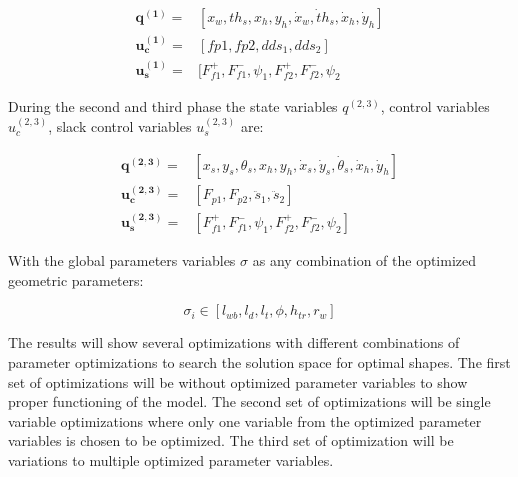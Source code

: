 \documentclass[default,iicol]{sn-jnl}
\begin{document}
{\begin{equation}
\begin{array}{rl}
   \mathbf{q^{(1)}} =& [x_w , th_s, x_h, y_h, \dot x_w, \dot th_s,\dot x_h, \dot y_h]    \\
   \mathbf{u_c^{(1)}} =& [fp1, fp2, dds_1, dds_2]  \\
   \mathbf{u_s^{(1)}}=&  [F_{f1}^+, F_{f1}^-, \psi_1,F_{f2}^+, F_{f2}^-, \psi_2 
\end{array}
\end{equation}

During the second and third phase the state variables $q^{(2,3)}$, control variables $u_c^{(2,3)}$, slack control variables $u_s^{(2,3)}$ are:

\begin{equation}
\begin{array}{rl}
   \mathbf{q^{(2,3)}} =& [x_s, y_s, \theta_s, x_h, y_h, \dot x_s, \dot y_s, \dot \theta_s,\dot x_h, \dot y_h]    \\
   \mathbf{u_c^{(2,3)}} =& [F_{p1}, F_{p2}, \ddot s_1, \ddot s_2]  \\
   \mathbf{u_s^{(2,3)}}=&  [F_{f1}^+, F_{f1}^-, \psi_1,F_{f2}^+, F_{f2}^-, \psi_2] 
\end{array}
\end{equation}

With the global parameters variables $\sigma$ as any combination of the optimized geometric parameters: 

\begin{equation}
    \sigma_i \in [l_{wb}, l_d, l_t, \phi, h_{tr}, r_w]
\end{equation}

The results will show several optimizations with different combinations of parameter optimizations to search the solution space for optimal shapes. The first set of optimizations will be without optimized parameter variables to show proper functioning of the model. The second set of optimizations will be single variable optimizations where only one variable from the optimized parameter variables is chosen to be optimized. The third set of optimization will be variations to multiple optimized parameter variables. 

}
\end{document}
